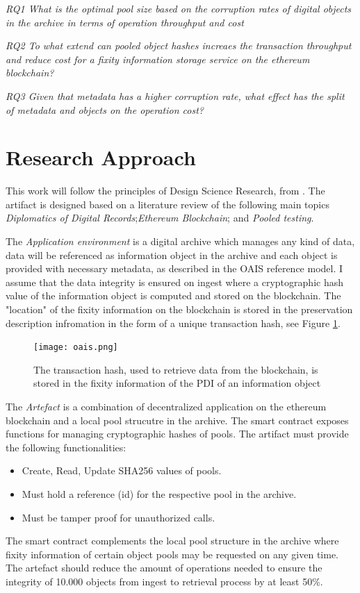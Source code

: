 \textit{RQ1 What is the optimal pool size based on the corruption rates of digital objects in the archive in terms of operation throughput and cost}

\textit{RQ2 To what extend can pooled object hashes increaes the transaction throughput and reduce cost for a fixity information storage service on the ethereum blockchain?}

\textit{RQ3 Given that metadata has a higher corruption rate, what effect has the split of metadata and objects on the operation cost?}

\section{Research Approach}
\label{sec:approach}
This work will follow the principles of Design Science Research, from \cite{hevner2007three}. The artifact is designed based on a literature review of the following main topics \textit{Diplomatics of Digital Records};\textit{Ethereum Blockchain}; and \textit{Pooled testing}.

The \textit{Application environment} is a digital archive which manages any kind of data, data will be referenced as information object in the archive and each object is provided with necessary metadata, as described in the OAIS reference model. I assume that the data integrity is ensured on ingest where a cryptographic hash value of the information object is computed and stored on the blockchain. The "location" of the fixity information on the blockchain is stored in the preservation description infromation in the form of a unique transaction hash, see Figure \ref{fig:oais-fixity}. 

\begin{figure}[h]
    \label{fig:oais-fixity}
    \caption{The transaction hash, used to retrieve data from the blockchain, is stored in the fixity information of the PDI of an information object \cite[7]{lee2010open}}
    \centering
    \texttt{[image: oais.png]}
\end{figure}

The \textit{Artefact} is a combination of decentralized application on the ethereum blockchain and a local pool strucutre in the archive. The smart contract exposes functions for managing cryptographic hashes of pools.
The artifact must provide the following functionalities:
\begin{itemize}
  \item Create, Read, Update SHA256 values of pools.
  \item Must hold a reference (id) for the respective pool in the archive.
  \item Must be tamper proof for unauthorized calls.
\end{itemize}
The smart contract complements the local pool structure in the archive where fixity information of certain object pools may be requested on any given time. The artefact should reduce the amount of operations needed to ensure the integrity of 10.000 objects from ingest to retrieval process by at least 50\%.